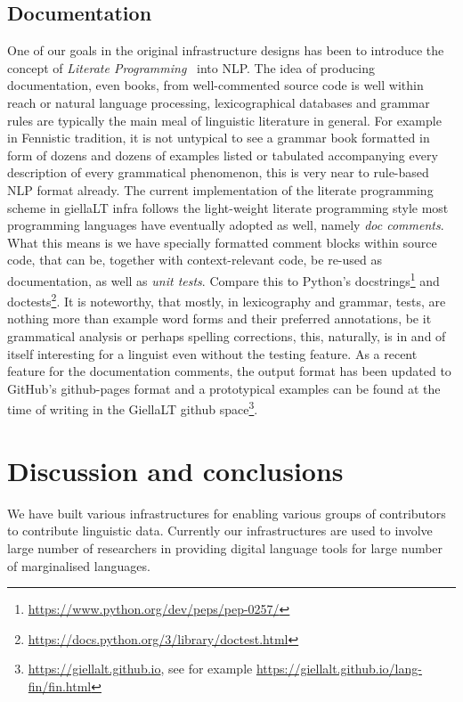 \documentclass[free]{flammie}
\begin{document}
\subsection{Documentation}

One of our goals in the original infrastructure designs has been to introduce the concept of \textit{Literate Programming}~\cite{knuth1984literate} into NLP.
The idea of producing documentation, even books, from well-commented source code is well within reach or natural language processing, lexicographical databases and grammar rules are typically the main meal of linguistic literature in general.
For example in Fennistic tradition, it is not untypical to see a grammar book formatted in form of dozens and dozens of examples listed or tabulated accompanying every description of every grammatical phenomenon, this is very near to rule-based NLP format already.
The current implementation of the literate programming scheme in giellaLT infra follows the light-weight literate programming style most programming languages have eventually adopted as well, namely \textit{doc comments}.
What this means is we have specially formatted comment blocks within source code, that can be, together with context-relevant code, be re-used as documentation, as well as \textit{unit tests}.
Compare this to Python's docstrings\footnote{\url{https://www.python.org/dev/peps/pep-0257/}} and doctests\footnote{\url{https://docs.python.org/3/library/doctest.html}}.
It is noteworthy, that mostly, in lexicography and grammar, tests, are nothing more than example word forms and their preferred annotations, be it grammatical analysis or perhaps spelling corrections, this, naturally, is in and of itself interesting for a linguist even without the testing feature.
As a recent feature for the documentation comments, the output format has been updated to GitHub's github-pages format and a prototypical examples can be found at the time of writing in the GiellaLT github space\footnote{\url{https://giellalt.github.io}, see for example \url{https://giellalt.github.io/lang-fin/fin.html}}.


\section{Discussion and conclusions} \label{sec:discussion}

We have built various infrastructures for enabling various groups of contributors to contribute linguistic data.
Currently our infrastructures are used to involve large number of researchers in providing digital language tools for large number of marginalised languages.
\end{document}
